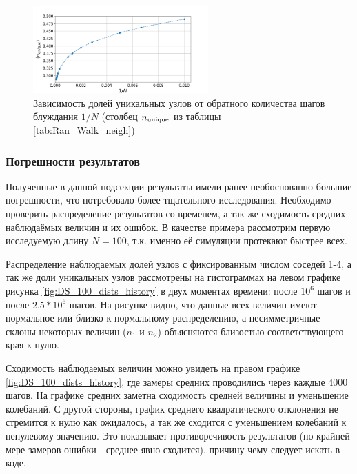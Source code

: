 \begin{figure}[h]
\begin{minipage}{0.49\textwidth}
\label{fig:DS_n_iu}
\end{minipage}
\centering
\includegraphics[width=0.6\textwidth]{Sections/Images_2/Rand_Path_n_unique.png}
\caption{Зависимость долей уникальных узлов от обратного количества шагов блуждания $1/N$ (столбец $n_{\textup{unique}}$ из таблицы \ref{tab:Ran_Walk_neigh})}
\label{fig:DS_n_u}
\end{figure} 

\newpage

\subsubsection{Погрешности результатов}

Полученные в данной подсекции результаты имели ранее необоснованно большие погрешности, что потребовало более тщательного исследования. 
Необходимо проверить распределение результатов со временем, а так же сходимость средних наблюдаёмых величин и их ошибок.
 В качестве примера рассмотрим первую исследуемую длину $N=100$, т.к. именно её симуляции протекают быстрее всех.  

Распределение наблюдаемых долей узлов с фиксированным числом соседей 1-4, а так же доли уникальных узлов рассмотрены на гистограммах на левом графике рисунка \ref{fig:DS_100_dists_history}  в двух моментах времени: после $10^6$ шагов и после $2.5 * 10^6$  шагов. 
На рисунке видно, что данные всех величин имеют нормальное или близко к нормальному распределению, а несимметричные склоны  некоторых величин ($n_1$ и $n_2$) объясняются близостью соответствующего края к нулю.

Сходимость наблюдаемых величин можно увидеть на правом графике \ref{fig:DS_100_dists_history}, где замеры средних проводились через каждые 4000 шагов. На графике средних заметна сходимость средней величины и уменьшение колебаний. 
С другой стороны, график среднего квадратического отклонения не стремится к нулю как ожидалось, а так же сходится с уменьшением колебаний к ненулевому значению. 
Это показывает противоречивость результатов (по крайней мере замеров ошибки - среднее явно сходится), причину чему следует искать в коде. 

